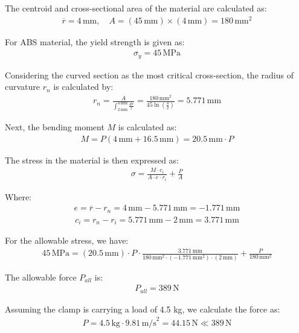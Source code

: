 \documentclass[12pt]{report}
\begin{document}
The centroid and cross-sectional area of the material are calculated as:
\begin{align}
\overline{r} = 4 \, \text{mm}, \quad A = (45 \, \text{mm}) \times (4 \, \text{mm}) = 180 \, \text{mm}^2
\end{align}

For ABS material, the yield strength is given as:
\begin{align}
\sigma_y = 45 \, \text{MPa}
\end{align}

Considering the curved section as the most critical cross-section, the radius of curvature \( r_n \) is calculated by:
\begin{align}
r_n = \frac{A}{\int_{2 \, \text{mm}}^{4 \, \text{mm}} \frac{dr}{r}} = \frac{180 \, \text{mm}^2}{45 \ln \left( \frac{4}{2} \right)} = 5.771 \, \text{mm}
\end{align}

Next, the bending moment \( M \) is calculated as:
\begin{align}
M = P(4 \, \text{mm} + 16.5 \, \text{mm}) = 20.5 \, \text{mm} \cdot P
\end{align}

The stress in the material is then expressed as:
\begin{align}
\sigma = \frac{M \cdot c_i}{A \cdot e \cdot r_i} + \frac{P}{A}
\end{align}

Where:
\begin{align}
e = \overline{r} - r_n = 4 \, \text{mm} - 5.771 \, \text{mm} = -1.771 \, \text{mm}
\end{align}
\begin{align}
c_i = r_n - r_i = 5.771 \, \text{mm} - 2 \, \text{mm} = 3.771 \, \text{mm}
\end{align}

For the allowable stress, we have:
\begin{align}
45 \, \text{MPa} = (20.5 \, \text{mm}) \cdot P \cdot \frac{3.771 \, \text{mm}}{180 \, \text{mm}^2 \cdot (-1.771 \, \text{mm}^2) \cdot (2 \, \text{mm})} + \frac{P}{180 \, \text{mm}^2}
\end{align}

The allowable force \( P_{all} \) is:
\begin{align}
P_{all} = 389 \, \text{N}
\end{align}

Assuming the clamp is carrying a load of 4.5 kg, we calculate the force as:
\begin{align}
P = 4.5 \, \text{kg} \cdot 9.81 \, \text{m/s}^2 = 44.15 \, \text{N} \ll 389 \, \text{N}
\end{align}
\end{document}
